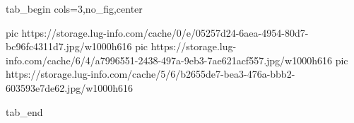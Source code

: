  
 
 
 
 


\ifcmt
  tab_begin cols=3,no_fig,center

     pic https://storage.lug-info.com/cache/0/e/05257d24-6aea-4954-80d7-bc96fc4311d7.jpg/w1000h616%
		 pic https://storage.lug-info.com/cache/6/4/a7996551-2438-497a-9eb3-7ae621acf557.jpg/w1000h616%
		 pic https://storage.lug-info.com/cache/5/6/b2655de7-bea3-476a-bbb2-603593e7de62.jpg/w1000h616%

  tab_end
\fi
